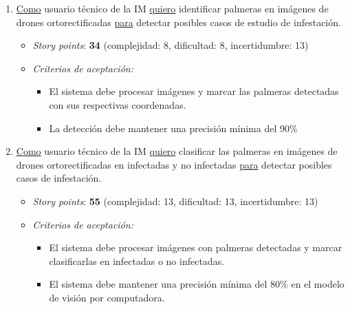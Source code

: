 \documentclass[
11pt, %
]{charter}
\begin{document}
\begin{enumerate}
  \item \underline{Como} usuario técnico de la IM \underline{quiero} identificar palmeras en imágenes de drones ortorectificadas \underline{para} detectar posibles casos de estudio de infestación.
        \begin{itemize}
          \item \textit{Story points}: \textbf{34} (complejidad: 8, dificultad: 8, incertidumbre: 13)
          \item \textit{Criterios de aceptación:}
                \begin{itemize}
                  \item El sistema debe procesar imágenes y marcar las palmeras detectadas con sus respectivas coordenadas.
                  \item La detección debe mantener una precisión mínima del 90\%
                \end{itemize}
        \end{itemize}

  \item \underline{Como} usuario técnico de la IM \underline{quiero} clasificar las palmeras en imágenes de drones ortorectificadas en infectadas y no infectadas \underline{para} detectar posibles casos de infestación.
        \begin{itemize}
          \item \textit{Story points}: \textbf{55} (complejidad: 13, dificultad: 13, incertidumbre: 13)
          \item \textit{Criterios de aceptación:}
                \begin{itemize}
                  \item El sistema debe procesar imágenes con palmeras detectadas y marcar clasificarlas en infectadas o no infectadas.
                  \item El sistema debe mantener una precisión mínima del 80\% en el modelo de visión por computadora.
                \end{itemize}
        \end{itemize}


\end{enumerate}
\end{document}
